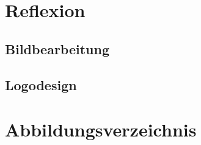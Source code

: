 \documentclass[11pt]{article}
\begin{document}
    \section{Reflexion}

    \subsection{Bildbearbeitung}

    \subsection{Logodesign}

    \section{Abbildungsverzeichnis}
    \begin{appendix}
        \listoffigures
    \end{appendix}
\end{document}
